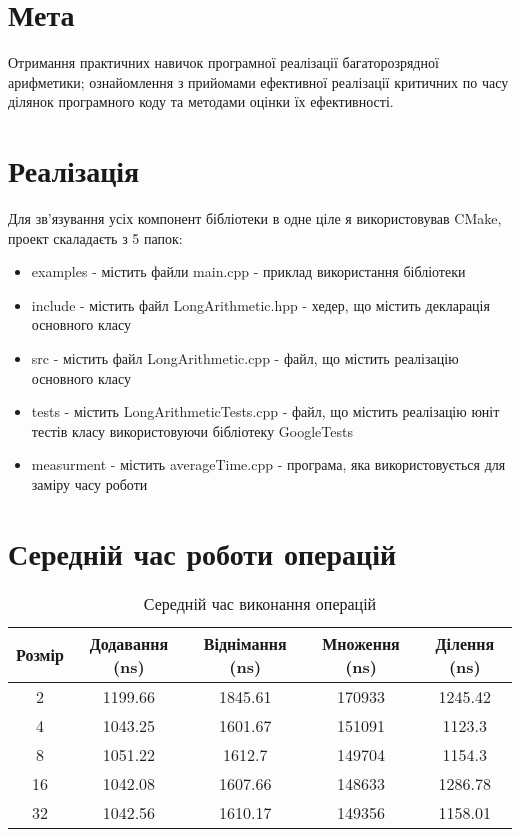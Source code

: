 \documentclass{article}
\begin{document}
\newpage
\section{Мета}
\quad Отримання практичних навичок програмної реалізації багаторозрядної арифметики;
ознайомлення з прийомами ефективної реалізації критичних по часу ділянок програмного коду та
методами оцінки їх ефективності.

\section{Реалізація}
\quad Для зв'язування усіх компонент бібліотеки в одне ціле я використовував CMake, проект скаладаєть з 5 папок:

\begin{itemize}
\item examples - містить файли main.cpp - приклад використання бібліотеки
\item include - містить файл LongArithmetic.hpp - хедер, що містить декларація основного класу
\item src - містить файл LongArithmetic.cpp - файл, що містить реалізацію основного класу
\item tests - містить LongArithmeticTests.cpp - файл, що містить реалізацію юніт тестів класу використовуючи бібліотеку GoogleTests
\item measurment - містить averageTime.cpp - програма, яка використовується для заміру часу роботи 
\end{itemize}

\section{Середній час роботи операцій}
\quad 
\begin{table}[h]
\centering
\begin{tabular}{|c|c|c|c|c|}
\hline
\textbf{Розмір} & \textbf{Додавання (ns)} & \textbf{Віднімання (ns)} & \textbf{Множення (ns)} & \textbf{Ділення (ns)} \\
\hline
2 & 1199.66 & 1845.61 & 170933 & 1245.42 \\
4 & 1043.25 & 1601.67 & 151091 & 1123.3 \\
8 & 1051.22 & 1612.7 & 149704 & 1154.3 \\
16 & 1042.08 & 1607.66 & 148633 & 1286.78 \\
32 & 1042.56 & 1610.17 & 149356 & 1158.01 \\
\hline
\end{tabular}
\caption{Середній час виконання операцій}
\label{tab:comparison}
\end{table}
\end{document}
